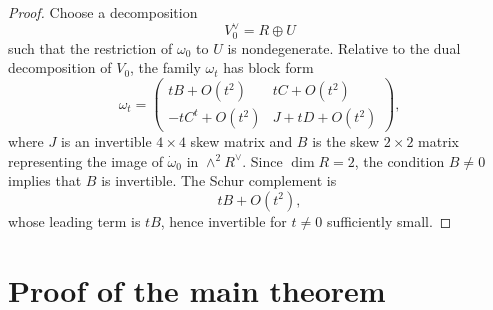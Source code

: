 \documentclass[11pt]{article}
\begin{document}
\begin{proof}
Choose a decomposition
\[
V_0^\vee = R\oplus U
\]
such that the restriction of \(\omega_0\) to \(U\) is nondegenerate. Relative to the dual decomposition of \(V_0\), the family \(\omega_t\) has block form
\[
\omega_t=
\begin{pmatrix}
tB+O(t^2) & tC+O(t^2)\\
-tC^t+O(t^2) & J+tD+O(t^2)
\end{pmatrix},
\]
where \(J\) is an invertible \(4\times4\) skew matrix and \(B\) is the skew \(2\times2\) matrix representing the image of \(\dot\omega_0\) in \(\wedge^2 R^\vee\). Since \(\dim R=2\), the condition \(B\neq 0\) implies that \(B\) is invertible. The Schur complement is
\[
{tB+O(t^2),}
\]
whose leading term is \(tB\), hence invertible for \(t\neq 0\) sufficiently small.
\end{proof}

\section{Proof of the main theorem}
\end{document}
